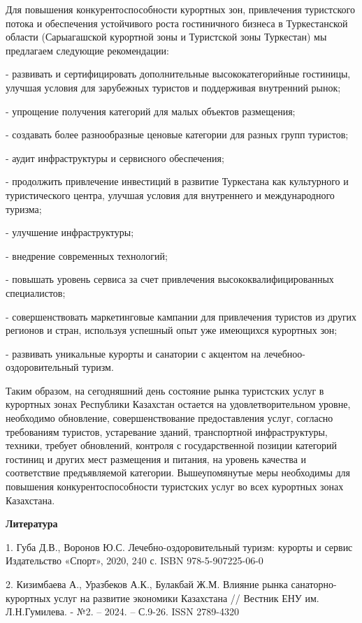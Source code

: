 Для повышения конкурентоспособности курортных зон, привлечения
туристского потока и обеспечения устойчивого роста гостиничного бизнеса
в Туркестанской области (Сарыагашской курортной зоны и Туристской зоны
Туркестан) мы предлагаем следующие рекомендации:

- развивать и сертифицировать дополнительные высококатегорийные
гостиницы, улучшая условия для зарубежных туристов и поддерживая
внутренний рынок;

- упрощение получения категорий для малых объектов размещения;

- создавать более разнообразные ценовые категории для разных групп
туристов;

- аудит инфраструктуры и сервисного обеспечения;

- продолжить привлечение инвестиций в развитие Туркестана как
культурного и туристического центра, улучшая условия для внутреннего и
международного туризма;

- улучшение инфраструктуры;

- внедрение современных технологий;

- повышать уровень сервиса за счет привлечения высококвалифицированных
специалистов;

- совершенствовать маркетинговые кампании для привлечения туристов из
других регионов и стран, используя успешный опыт уже имеющихся курортных
зон;

- развивать уникальные курорты и санатории с акцентом на
лечебноо-оздоровительный туризм.

Таким образом, на сегодняшний день состояние рынка туристских услуг в
курортных зонах Республики Казахстан остается на удовлетворительном
уровне, необходимо обновление, совершенствование предоставления услуг,
согласно требованиям туристов, устаревание зданий, транспортной
инфраструктуры, техники, требует обновлений, контроля с государственной
позиции категорий гостиниц и других мест размещения и питания, на
уровень качества и соответствие предъявляемой категории. Вышеупомянутые
меры необходимы для повышения конкурентоспособности туристских услуг во
всех курортных зонах Казахстана.

{\bfseries Литература}

1. Губа Д.В., Воронов Ю.С. Лечебно-оздоровительный туризм: курорты и
сервис Издательство «Спорт», 2020, 240 с. ISBN 978-5-907225-06-0~

2. Кизимбаева А., Уразбеков А.К., Булакбай Ж.М. Влияние рынка
санаторно-курортных услуг на развитие экономики Казахстана // Вестник
ЕНУ им. Л.Н.Гумилева. - №2. -- 2024. -- С.9-26. ISSN 2789-4320

